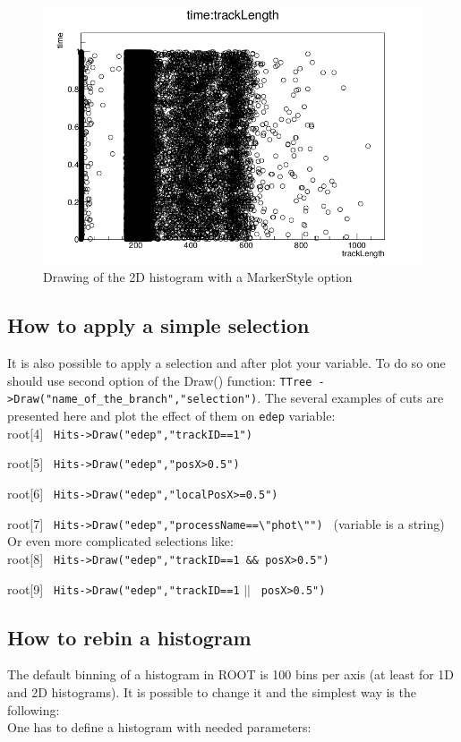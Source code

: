 \documentclass[12pt]{article}
\begin{document}
\begin{figure}[h]
\centering
\includegraphics[scale=0.5]{figs/2Dhist_markerstyle.png}
\caption{Drawing of the 2D histogram with a MarkerStyle option}
\label{fig:2Dhist_markerstyle}
\end{figure}

\clearpage
\subsection{How to apply a simple selection}
It is also possible to apply a selection and after plot your variable. To do so one should use second option of the Draw() function: \verb|TTree ->Draw("name_of_the_branch","selection")|. The several examples of cuts are presented here and plot the effect of them on \verb|edep| variable:\\

root[4] \verb| Hits->Draw("edep","trackID==1") |

root[5] \verb| Hits->Draw("edep","posX>0.5") |

root[6] \verb| Hits->Draw("edep","localPosX>=0.5") |

root[7] \verb| Hits->Draw("edep","processName==\"phot\"") | (variable is a string)\\

Or even more complicated selections like: \\

root[8] \verb| Hits->Draw("edep","trackID==1 && posX>0.5") |

root[9] \verb| Hits->Draw("edep","trackID==1| $||$ \verb| posX>0.5") |\\

\subsection{How to rebin a histogram}
The default binning of a histogram in ROOT is 100 bins per axis (at least for 1D and 2D histograms). It is possible to change it and the simplest way is the following:\\
One has to define a histogram with needed parameters:\\
\end{document}

